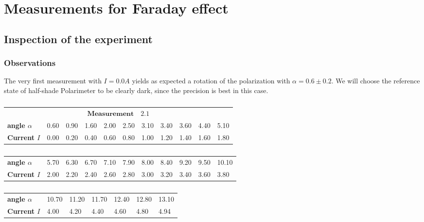\section{Measurements for Faraday effect}
\subsection{Inspection of the experiment}
\subsubsection{Observations}
The very first measurement with $I=0.0A$ yields as expected a rotation of the polarization
with $\alpha = 0.6 \pm 0.2$. We will choose the reference state of half-shade Polarimeter 
to be clearly dark, since the precision is best in this case.



    \begin{table}[htdp]
        \begin{tabular}{|l||p{1.1cm}|p{1.1cm}|p{1.1cm}|p{1.1cm}|p{1.1cm}|p{1.1cm}|p{1.1cm}|p{1.1cm}|p{1.1cm}|p{1.1cm}|}
        \hline
            \multicolumn{11}{|c|}{\cellcolor[RGB]{206,250,201}$
            \mathbf{Measurement \quad 2.1}$} \\
\textbf{angle $\alpha$}& 0.60& 0.90& 1.60& 2.00& 2.50& 3.10& 3.40& 3.60& 4.40& 5.10 \\
\textbf{Current $I$}& 0.00& 0.20& 0.40& 0.60& 0.80& 1.00& 1.20& 1.40& 1.60& 1.80 \\

        \hline
        \end{tabular}
        \begin{tabular}{|l||p{1.1cm}|p{1.1cm}|p{1.1cm}|p{1.1cm}|p{1.1cm}|p{1.1cm}|p{1.1cm}|p{1.1cm}|p{1.1cm}|p{1.1cm}|}
        \hline\textbf{angle $\alpha$}& 5.70& 6.30& 6.70& 7.10& 7.90& 8.00& 8.40& 9.20& 9.50& 10.10 \\
\textbf{Current $I$}& 2.00& 2.20& 2.40& 2.60& 2.80& 3.00& 3.20& 3.40& 3.60& 3.80 \\

        \hline
        \end{tabular}
    \begin{tabular}{|l||p{1.1cm}|p{1.1cm}|p{1.1cm}|p{1.1cm}|p{1.1cm}|p{1.1cm}|}
    \hline\textbf{angle $\alpha$}& 10.70& 11.20& 11.70& 12.40& 12.80& 13.10 \\
\textbf{Current $I$}& 4.00& 4.20& 4.40& 4.60& 4.80& 4.94 \\

    \hline
    \end{tabular}
    \caption{}
    \label{Power05}
    \end{table}

